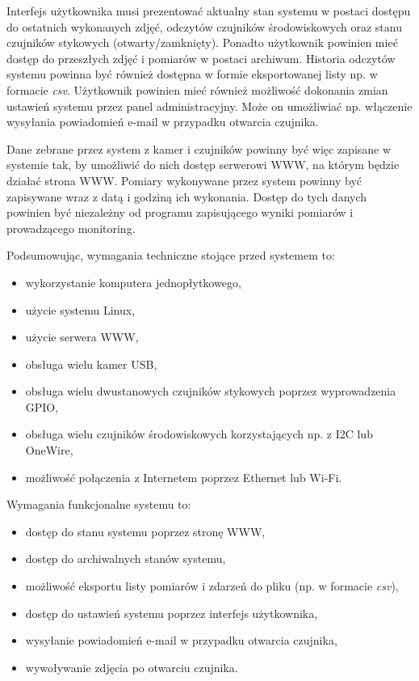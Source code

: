 \documentclass[a4paper,11pt,twoside]{article}
\begin{document}
Interfejs użytkownika musi prezentować aktualny stan systemu w postaci dostępu do ostatnich wykonanych zdjęć, odczytów czujników środowiskowych oraz stanu czujników stykowych (otwarty/zamknięty). Ponadto użytkownik powinien mieć dostęp do przeszłych zdjęć i pomiarów w postaci archiwum. Historia odczytów systemu powinna być również dostępna w formie eksportowanej listy np. w formacie \textit{csv}. Użytkownik powinien mieć również możliwość dokonania zmian ustawień systemu przez panel administracyjny. Może on umożliwiać np. włączenie wysyłania powiadomień e-mail w przypadku otwarcia czujnika.

Dane zebrane przez system z kamer i czujników powinny być więc zapisane w systemie tak, by umożliwić do nich dostęp serwerowi WWW, na którym będzie działać strona WWW. Pomiary wykonywane przez system powinny być zapisywane wraz z datą i godziną ich wykonania. Dostęp do tych danych powinien być niezależny od programu zapisującego wyniki pomiarów i prowadzącego monitoring.

Podsumowując, wymagania techniczne stojące przed systemem to:
\begin{itemize}
\item wykorzystanie komputera jednopłytkowego,
\item użycie systemu Linux,
\item użycie serwera WWW,
\item obsługa wielu kamer USB,
\item obsługa wielu dwustanowych czujników stykowych poprzez wyprowadzenia GPIO,
\item obsługa wielu czujników środowiskowych korzystających np. z I2C lub OneWire,
\item możliwość połączenia z Internetem poprzez Ethernet lub Wi-Fi.
\end{itemize}

Wymagania funkcjonalne systemu to:
\begin{itemize}
\item dostęp do stanu systemu poprzez stronę WWW,
\item dostęp do archiwalnych stanów systemu,
\item możliwość eksportu listy pomiarów i zdarzeń do pliku (np. w formacie \textit{csv}),
\item dostęp do ustawień systemu poprzez interfejs użytkownika,
\item wysyłanie powiadomień e-mail w przypadku otwarcia czujnika,
\item wywoływanie zdjęcia po otwarciu czujnika.
\end{itemize}
\end{document}
